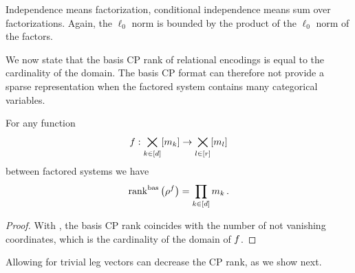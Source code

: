 \begin{example}
	Independence means factorization, conditional independence means sum over factorizations.
	Again, the $\ell_0$ norm is bounded by the product of the $\ell_0$ norm of the factors.
\end{example}






We now state that the basis CP rank of relational encodings is equal to the cardinality of the domain.
The basis CP format can therefore not provide a sparse representation when the factored system contains many categorical variables.

\begin{theorem}\label{the:rencodingBasCP}
	For any function
		\[ f : \bigtimes_{k\in[d]}[m_{k}] \rightarrow  \bigtimes_{l\in[r]}[m_{l}] \]
	between factored systems we have
		\[ \mathrm{rank}^{\mathrm{bas}}\left(\rho^{f}\right) =  \prod_{k\in[d]}m_{k} \, . \]
\end{theorem}
\begin{proof}
	With , the basis CP rank coincides with the number of not vanishing coordinates, which is the cardinality of the domain of $f$.
\end{proof}

Allowing for trivial leg vectors can decrease the CP rank, as we show next.


